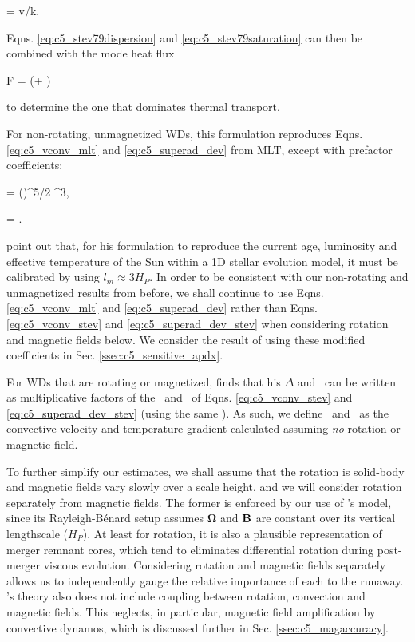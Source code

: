 \eqbegin
\sigma = v/k.
\label{eq:c5_stev79saturation}
\eqend

\noindent Eqns. \ref{eq:c5_stev79dispersion} and \ref{eq:c5_stev79saturation} can then be combined with the mode heat flux

\eqbegin
F = \left(\sigma + \right)
\label{eq:c5_stev79flux}
\eqend

\noindent to determine the one that dominates thermal transport.

For non-rotating, unmagnetized WDs, this formulation reproduces Eqns. \ref{eq:c5_vconv_mlt} and \ref{eq:c5_superad_dev} from MLT, except with prefactor coefficients:

\eqbegin
\Fconv = \left(\right)^{5/2} \vconv^3,
\label{eq:c5_vconv_stev}
\eqend

\eqbegin
\dnabconv = .
\label{eq:c5_superad_dev_stev}
\eqend

\noindent \citeal{stev79} point out that, for his formulation to reproduce the current age, luminosity and effective temperature of the Sun within a 1D stellar evolution model, it must be calibrated by using $l_m \approx 3H_P$.  In order to be consistent with our non-rotating and unmagnetized results from before, we shall continue to use Eqns. \ref{eq:c5_vconv_mlt} and \ref{eq:c5_superad_dev} rather than Eqns. \ref{eq:c5_vconv_stev} and \ref{eq:c5_superad_dev_stev} when considering rotation and magnetic fields below.  We consider the result of using these modified coefficients in Sec. \ref{ssec:c5_sensitive_apdx}.


For WDs that are rotating or magnetized, \citeal{stev79} finds that his $\Delta$ and \vconv\ can be written as multiplicative factors of the \dnabconv\ and \vconv\ of Eqns. \ref{eq:c5_vconv_stev} and \ref{eq:c5_superad_dev_stev} (using the same \Fconv).  As such, we define \vconvzero\ and \dnabconvzero\ as the convective velocity and temperature gradient calculated assuming \textit{no} rotation or magnetic field.

To further simplify our estimates, we shall assume that the rotation is solid-body and magnetic fields vary slowly over a scale height, and we will consider rotation separately from magnetic fields.  The former is enforced by our use of \citeal{stev79}'s model, since its Rayleigh-B\'{e}nard setup assumes $\boldsymbol{\Omega}$ and ${\bf B}$ are constant over its vertical lengthscale ($H_P$).  At least for rotation, it is also a plausible representation of merger remnant cores, which tend to eliminates differential rotation during post-merger viscous evolution.  Considering rotation and magnetic fields separately allows us to independently gauge the relative importance of each to the runaway.  \citeal{stev79}'s theory also does not include coupling between rotation, convection and magnetic fields.  This neglects, in particular, magnetic field amplification by convective dynamos, which is discussed further in Sec. \ref{ssec:c5_magaccuracy}.

